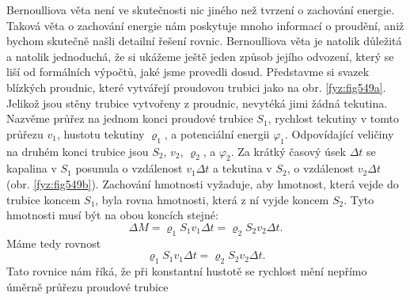     Bernoulliova věta není ve skutečnosti nic jiného než tvrzení o zachování energie. Taková věta o 
    zachování energie nám poskytuje mnoho informací o proudění, aniž bychom skutečně našli detailní 
    řešení rovnic. Bernoulliova věta je natolik důležitá a natolik jednoduchá, že si ukážeme ještě 
    jeden způsob jejího odvození, který se liší od formálních výpočtů, jaké jsme provedli dosud. 
    Představme si svazek blízkých proudnic, které vytvářejí proudovou trubici jako na obr. 
    \ref{fyz:fig549a}. Jelikož jsou stěny trubice vytvořeny z proudnic, nevytéká jimi žádná 
    tekutina. Nazvěme průřez na jednom konci proudové trubice \(S_1\), rychlost tekutiny v tomto 
    průřezu \(v_1\), hustotu tekutiny \(\varrho_1\), a potenciální energii  \(\varphi_1\). 
    Odpovídající veličiny na druhém konci trubice jsou \(S_2\), \(v_2\), \(\varrho_2\), a 
    \(\varphi_2\). Za krátký časový úsek \(\Delta t\) se kapalina v \(S_1\) posunula o vzdálenost 
    \(v_1\Delta t\) a tekutina v \(S_2\), o vzdálenost \(v_2\Delta t\) (obr. \ref{fyz:fig549b}). 
    Zachování hmotnosti vyžaduje, aby hmotnost, která vejde do trubice koncem \(S_1\), byla rovna 
    hmotnosti, která z ní vyjde koncem \(S_2\). Tyto hmotnosti musí být na obou koncích stejné:
    \begin{equation*}
      \Delta M = \varrho_1S_1v_1\Delta t = \varrho_2S_2v_2\Delta t.
    \end{equation*}
    Máme tedy rovnost
    \begin{equation}\label{fyz:eq561}
      \varrho_1S_1v_1\Delta t = \varrho_2S_2v_2\Delta t.
    \end{equation}
    Tato rovnice nám říká, že při konstantní hustotě se rychlost mění nepřímo úměrně průřezu 
    proudové trubice
    

